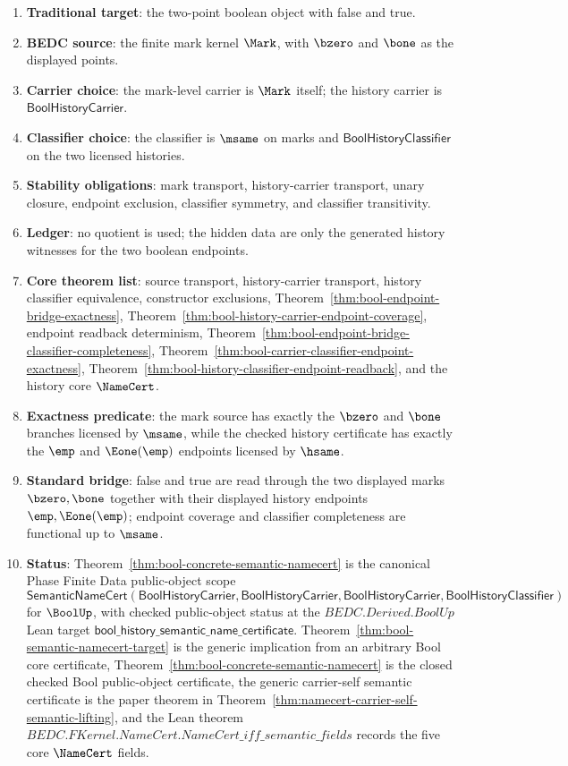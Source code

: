 \begin{enumerate}
  \item \textbf{Traditional target}: the two-point boolean object with false and true.
  \item \textbf{BEDC source}: the finite mark kernel $\Mark$, with $\bzero$ and $\bone$ as the displayed points.
  \item \textbf{Carrier choice}: the mark-level carrier is $\Mark$ itself; the history carrier is $\mathsf{BoolHistoryCarrier}$.
  \item \textbf{Classifier choice}: the classifier is $\msame$ on marks and $\mathsf{BoolHistoryClassifier}$ on the two licensed histories.
  \item \textbf{Stability obligations}: mark transport, history-carrier transport, unary closure, endpoint exclusion, classifier symmetry, and classifier transitivity.
  \item \textbf{Ledger}: no quotient is used; the hidden data are only the generated history witnesses for the two boolean endpoints.
  \item \textbf{Core theorem list}: source transport, history-carrier transport, history classifier equivalence, constructor exclusions, Theorem~\ref{thm:bool-endpoint-bridge-exactness}, Theorem~\ref{thm:bool-history-carrier-endpoint-coverage}, endpoint readback determinism, Theorem~\ref{thm:bool-endpoint-bridge-classifier-completeness}, Theorem~\ref{thm:bool-carrier-classifier-endpoint-exactness}, Theorem~\ref{thm:bool-history-classifier-endpoint-readback}, and the history core $\NameCert$.
  \item \textbf{Exactness predicate}: the mark source has exactly the $\bzero$ and $\bone$ branches licensed by $\msame$, while the checked history certificate has exactly the $\emp$ and $\Eone(\emp)$ endpoints licensed by $\hsame$.
  \item \textbf{Standard bridge}: false and true are read through the two displayed marks $\bzero,\bone$ together with their displayed history endpoints $\emp,\Eone(\emp)$; endpoint coverage and classifier completeness are functional up to $\msame$.
  \item \textbf{Status}: Theorem~\ref{thm:bool-concrete-semantic-namecert} is the canonical Phase Finite Data public-object scope
  $$
  \mathsf{SemanticNameCert}(\mathsf{BoolHistoryCarrier},\mathsf{BoolHistoryCarrier},
  \mathsf{BoolHistoryCarrier},\mathsf{BoolHistoryClassifier})
  $$
  for $\BoolUp$, with checked public-object status at the $BEDC.Derived.BoolUp$
  Lean target
  $\mathsf{bool\_history\_semantic\_name\_certificate}$. Theorem~\ref{thm:bool-semantic-namecert-target}
  is the generic implication from an arbitrary Bool core certificate,
  Theorem~\ref{thm:bool-concrete-semantic-namecert} is the closed checked Bool
  public-object certificate, the generic carrier-self semantic certificate is
  the paper theorem in Theorem~\ref{thm:namecert-carrier-self-semantic-lifting},
  and the Lean theorem
  $BEDC.FKernel.NameCert.NameCert\_iff\_semantic\_fields$ records the five core
  $\NameCert$ fields.
\end{enumerate}

